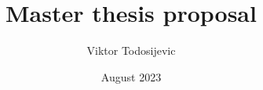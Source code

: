 \documentclass{report}%
\title{Master thesis proposal}%
\author{Viktor Todosijevic}%
\date{August 2023}%
\begin{document}
%
\normalsize%
\maketitle%
%
%
%
%
\printbibliography%
\end{document}

